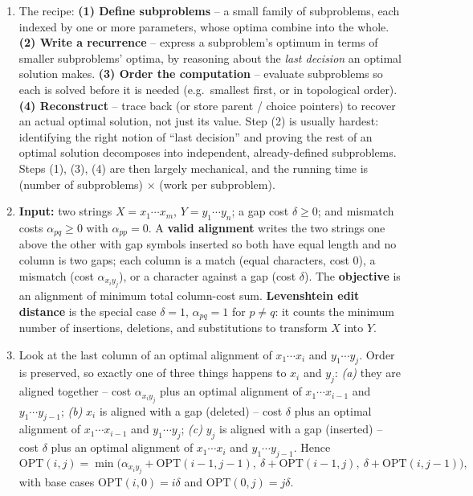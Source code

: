 \documentclass[11pt]{article}
\begin{document}
\begin{enumerate}[label=\textbf{A\arabic*.}, leftmargin=2.2em]

\item The recipe: \textbf{(1) Define subproblems} -- a small family of subproblems, each
indexed by one or more parameters, whose optima combine into the whole. \textbf{(2) Write a
recurrence} -- express a subproblem's optimum in terms of smaller subproblems' optima, by
reasoning about the \emph{last decision} an optimal solution makes. \textbf{(3) Order the
computation} -- evaluate subproblems so each is solved before it is needed (e.g.\ smallest
first, or in topological order). \textbf{(4) Reconstruct} -- trace back (or store parent /
choice pointers) to recover an actual optimal solution, not just its value. Step (2) is
usually hardest: identifying the right notion of ``last decision'' and proving the rest of
an optimal solution decomposes into independent, already-defined subproblems. Steps (1),
(3), (4) are then largely mechanical, and the running time is (number of subproblems)
$\times$ (work per subproblem).

\item \textbf{Input:} two strings $X = x_1\cdots x_m$, $Y = y_1\cdots y_n$; a gap cost
$\delta \ge 0$; and mismatch costs $\alpha_{pq} \ge 0$ with $\alpha_{pp} = 0$. A
\textbf{valid alignment} writes the two strings one above the other with gap symbols
inserted so both have equal length and no column is two gaps; each column is a match
(equal characters, cost $0$), a mismatch (cost $\alpha_{x_i y_j}$), or a character against a
gap (cost $\delta$). The \textbf{objective} is an alignment of minimum total column-cost
sum. \textbf{Levenshtein edit distance} is the special case $\delta = 1$, $\alpha_{pq} = 1$
for $p \ne q$: it counts the minimum number of insertions, deletions, and substitutions to
transform $X$ into $Y$.

\item Look at the last column of an optimal alignment of $x_1\cdots x_i$ and $y_1\cdots
y_j$. Order is preserved, so exactly one of three things happens to $x_i$ and $y_j$:
\emph{(a)} they are aligned together -- cost $\alpha_{x_i y_j}$ plus an optimal alignment of
$x_1\cdots x_{i-1}$ and $y_1\cdots y_{j-1}$; \emph{(b)} $x_i$ is aligned with a gap (deleted)
-- cost $\delta$ plus an optimal alignment of $x_1\cdots x_{i-1}$ and $y_1\cdots y_j$;
\emph{(c)} $y_j$ is aligned with a gap (inserted) -- cost $\delta$ plus an optimal alignment
of $x_1\cdots x_i$ and $y_1\cdots y_{j-1}$. Hence
\[
\mathrm{OPT}(i,j) = \min\big( \alpha_{x_i y_j} + \mathrm{OPT}(i-1,j-1),\ \delta +
\mathrm{OPT}(i-1,j),\ \delta + \mathrm{OPT}(i,j-1)\big),
\]
with base cases $\mathrm{OPT}(i,0) = i\delta$ and $\mathrm{OPT}(0,j) = j\delta$.


\end{enumerate}
\end{document}
